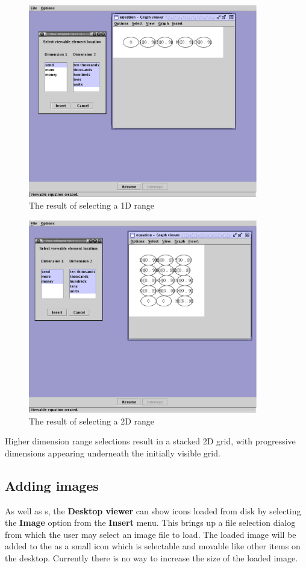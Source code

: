 \begin{figure}[htp]
\centering
\includegraphics[width=10cm]{vcrangeselect1d}
\caption{The result of selecting a 1D range}
\label{fig:rangeselect1d}
\end{figure}

\begin{figure}[htp]
\centering
\includegraphics[width=10cm]{vcrangeselect2d}
\caption{The result of selecting a 2D range}
\label{fig:rangeselect2d}
\end{figure}

Higher dimension range selections result in a stacked 2D grid, with
progressive dimensions appearing underneath the initially visible grid.

\subsection{Adding images}

As well as \viewlet{}s, the \textbf{Desktop viewer} can show icons
loaded from disk by selecting the \textbf{Image} option from the
\textbf{Insert} menu.  This brings up a file selection dialog from
which the user may select an image file to load.  The loaded image
will be added to the \viewer{} as a small icon which is selectable and
movable like other items on the desktop.  Currently there is no way to
increase the size of the loaded image.

